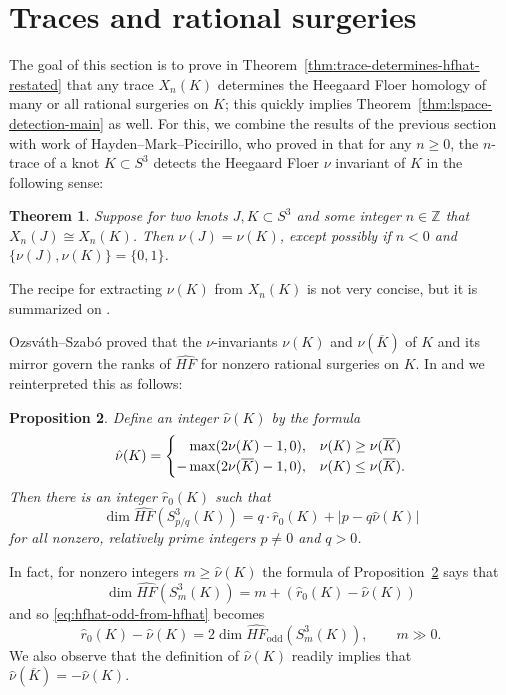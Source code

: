 \documentclass[11pt]{amsart}
\newtheorem {theorem}{Theorem}
\newtheorem {proposition}[theorem]{Proposition}
\numberwithin{equation}{section}
\numberwithin{theorem}{section}
\theoremstyle{definition}
\newcommand{\Z}{\mathbb{Z}}
\newcommand{\hfhat}{\widehat{\mathit{HF}}}
\newcommand{\godd}{\mathrm{odd}}
\newcommand{\mirror}[1]{\overline{#1}}
\begin{document}
\section{Traces and rational surgeries} \label{sec:rational-surgeries}
The goal of this section is to prove in Theorem~\ref{thm:trace-determines-hfhat-restated} that any trace $X_n(K)$  determines the Heegaard Floer homology of many or all rational surgeries on $K$; this quickly implies Theorem~\ref{thm:lspace-detection-main} as well. For this, we combine the results of the previous section with work of Hayden--Mark--Piccirillo, who proved in \cite[Theorem~1.4]{hayden-mark-piccirillo} that for any $n \geq 0$, the $n$-trace of a knot $K\subset S^3$ detects the Heegaard Floer $\nu$ invariant of $K$ in the following sense:

\begin{theorem} \label{thm:hmp-nu}
Suppose for two knots $J,K \subset S^3$ and some integer $n \in \Z$ that  $X_n(J) \cong X_n(K)$.  Then $\nu(J) = \nu(K)$, except possibly if $n<0$ and $\{\nu(J),\nu(K)\} = \{0,1\}$.
\end{theorem}

The recipe for extracting $\nu(K)$ from $X_n(K)$ is not very concise, but it is summarized on \cite[p.~17]{hayden-mark-piccirillo}.

Ozsv\'ath--Szab\'o \cite[Proposition~9.6]{osz-rational} proved that the $\nu$-invariants $\nu(K)$ and $\nu(\mirror{K})$ of $K$ and its mirror govern the ranks of $\hfhat$ for nonzero rational surgeries on $K$.  In \cite[Proposition~10.1]{bs-concordance} and \cite[Lemma~10.4]{bs-concordance} we reinterpreted this as follows:

\begin{proposition}\label{prop:hfhat-surgeries}
Define an integer $\hat\nu(K)$ by the formula
\begin{equation} \label{eq:hat-nu}
\hat\nu(K) = \begin{cases} \hphantom{-}\max(2\nu(K)-1,0), & \nu(K) \geq \nu(\mirror{K}) \\ {-}\max(2\nu(\mirror{K})-1,0), & \nu(K) \leq \nu(\mirror{K}). \end{cases}
\end{equation}
Then there is an integer $\hat{r}_0(K)$ such that
\[ \dim \hfhat(S^3_{p/q}(K)) = q\cdot \hat{r}_0(K) + |p-q\hat\nu(K)| \]
for all nonzero, relatively prime integers $p \neq 0$ and $q > 0$.
\end{proposition}

In fact, for nonzero integers $m \geq \hat{\nu}(K)$ the formula of Proposition~\ref{prop:hfhat-surgeries} says that
\[ \dim \hfhat(S^3_m(K)) = m + (\hat{r}_0(K) - \hat{\nu}(K)) \]
and so \eqref{eq:hfhat-odd-from-hfhat} becomes
\begin{equation} \label{eq:r-nu-hfodd}
\hat{r}_0(K) - \hat{\nu}(K) = 2\dim \hfhat_\godd(S^3_m(K)), \qquad m \gg 0.
\end{equation}
We also observe that the definition of $\hat\nu(K)$ readily implies that $\hat\nu(\mirror{K}) = -\hat\nu(K)$.
\end{document}
